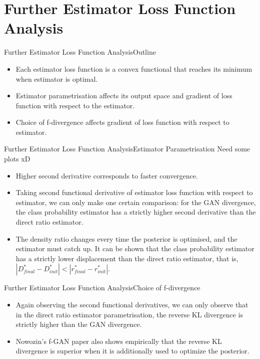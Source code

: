 \documentclass{beamer}
\begin{document}
\section{Further Estimator Loss Function Analysis}
\begin{frame}{Further Estimator Loss Function Analysis}{Outline}
\begin{itemize}
\item Each estimator loss function is a convex functional that reaches its minimum when estimator is optimal.
\item Estimator parametrisation affects its output space and gradient of loss function with respect to the estimator.
\item Choice of f-divergence affects gradient of loss function with respect to estimator.
\end{itemize}
\end{frame}
\begin{frame}{Further Estimator Loss Function Analysis}{Estimator Parametrisation}
Need some plots xD
\begin{itemize}
\item Higher second derivative corresponds to faster convergence.
\item Taking second functional derivative of estimator loss function with respect to estimator, we can only make one certain comparison: for the GAN divergence, the class probability estimator has a strictly higher second derivative than the direct ratio estimator.
\item The density ratio changes every time the posterior is optimised, and the estimator must catch up. It can be shown that the class probability estimator has a strictly lower displacement than the direct ratio estimator, that is, $|D^*_{final}-D^*_{init}|<|r^*_{final}-r^*_{init}|$.
\end{itemize}
\end{frame}
\begin{frame}{Further Estimator Loss Function Analysis}{Choice of f-divergence}
\begin{itemize}
\item Again observing the second functional derivatives, we can only observe that in the direct ratio estimator parametrisation, the reverse KL divergence is strictly higher than the GAN divergence.
\item Nowozin's f-GAN paper also shows empirically that the reverse KL divergence is superior when it is additionally used to optimize the posterior.
\end{itemize}
\end{frame}
\end{document}
